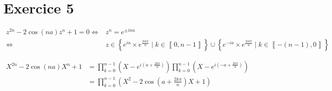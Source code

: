 \part{Exercice 5}

\begin{align*}
	z^{2n} - 2\cos(na) z^n + 1 = 0
	\iff& z^n = e^{\pm ina}\\
	\iff& z \in \left\{ e^{ia} \times e^{\frac{2ik\pi}{n}}  \mid k \in \left\llbracket 0, n - 1 \right\rrbracket \right\}
	\cup \left\{ e^{-ia} \times  e^{\frac{2ik\pi}{n}}  \mid k \in \left\llbracket -(n-1), 0 \right\rrbracket \right\} 
\end{align*}

\begin{align*}
	X^{2n} -2\cos(na) X^n + 1 &= \prod_{k=0}^{n-1} \left( X - e^{i \left( a + \frac{2k\pi}{n}\right)} \right) \prod_{k=0}^{n-1} \left( X - e^{i \left(-a + \frac{2k\pi}{n}\right)} \right) \\
	&= \prod_{k=0}^{n-1} \left( X^2 - 2\cos\left( a + \frac{2k\pi}{n} \right) X + 1 \right) \\
\end{align*}


